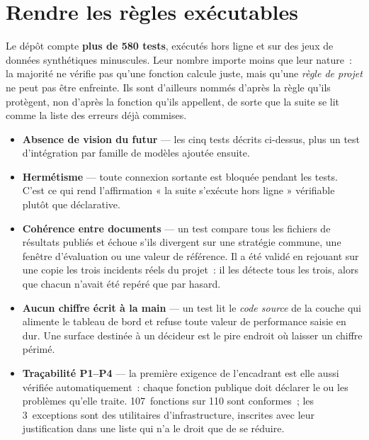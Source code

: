 \section{Rendre les règles exécutables}

Le dépôt compte \textbf{plus de 580 tests}, exécutés hors ligne
et sur des jeux de données synthétiques minuscules. Leur nombre importe moins que
leur nature~: la majorité ne vérifie pas qu'une fonction calcule juste, mais
qu'une \emph{règle de projet} ne peut pas être enfreinte. Ils sont d'ailleurs
nommés d'après la règle qu'ils protègent, non d'après la fonction qu'ils
appellent, de sorte que la suite se lit comme la liste des erreurs déjà commises.

\begin{itemize}
  \item \textbf{Absence de vision du futur} — les cinq tests décrits ci-dessus,
        plus un test d'intégration par famille de modèles ajoutée ensuite.
  \item \textbf{Hermétisme} — toute connexion sortante est bloquée pendant les
        tests. C'est ce qui rend l'affirmation « la suite s'exécute hors ligne »
        vérifiable plutôt que déclarative.
  \item \textbf{Cohérence entre documents} — un test compare tous les fichiers de
        résultats publiés et échoue s'ils divergent sur une stratégie commune,
        une fenêtre d'évaluation ou une valeur de référence. Il a été validé en
        rejouant sur une copie les trois incidents réels du projet~: il les
        détecte tous les trois, alors que chacun n'avait été repéré que par
        hasard.
  \item \textbf{Aucun chiffre écrit à la main} — un test lit le \emph{code source}
        de la couche qui alimente le tableau de bord et refuse toute valeur de
        performance saisie en dur. Une surface destinée à un décideur est le pire
        endroit où laisser un chiffre périmé.
  \item \textbf{Traçabilité P1--P4} — la première exigence de l'encadrant est
        elle aussi vérifiée automatiquement~: chaque fonction publique doit
        déclarer le ou les problèmes qu'elle traite. 107~fonctions sur 110 sont
        conformes~; les 3~exceptions sont des utilitaires d'infrastructure,
        inscrites avec leur justification dans une liste qui n'a le droit que de
        se réduire.
\end{itemize}

